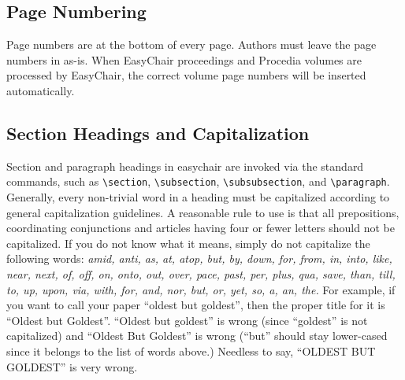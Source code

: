 \documentclass[EPiC]{easychair}
\newcommand{\easychair}{\textsf{easychair}}
\begin{document}
\subsection{Page Numbering}
\label{sect:page-numbering}

Page numbers are at the bottom of every page. Authors must leave the
page numbers in as-is. When EasyChair proceedings and Procedia volumes are processed by
EasyChair, the correct volume page numbers will be inserted
automatically.

\subsection{Section Headings and Capitalization}
\label{sect:section-headings}

Section and paragraph headings in {\easychair} are invoked via the standard 
commands, such as
\verb+\section+,
\verb+\subsection+,
\verb+\subsubsection+, and
\verb+\paragraph+.
Generally, every non-trivial word in a heading must be capitalized according to
general capitalization guidelines. A reasonable rule to use is that
all prepositions, coordinating conjunctions and articles having four
or fewer letters should not be capitalized. If you do not know what it
means, simply do not capitalize the following words:
\textit{amid, anti, as, at, atop, but, by, down, for, from, in, into, like,
near, next, of, off, on, onto, out, over, pace, past, per, plus, qua,
save, than, till, to, up, upon, via, with, for, and, nor, but, or,
yet, so, a, an, the.} For example, if you want to call your paper
``oldest but goldest'', then the proper title for it is ``Oldest but
Goldest''. ``Oldest but goldest'' is wrong (since ``goldest'' is not
capitalized) and ``Oldest But Goldest'' is wrong (``but'' should stay
lower-cased since it belongs to the list of words above.) Needless to
say, ``OLDEST BUT GOLDEST'' is very wrong.
\end{document}
